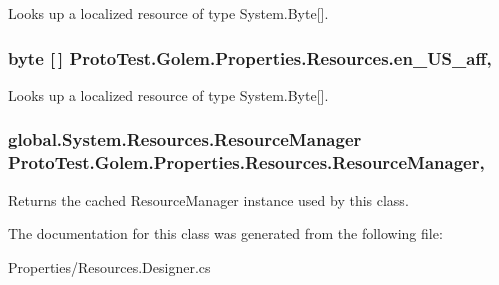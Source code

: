 Looks up a localized resource of type System.\-Byte\mbox{[}\mbox{]}. 

\hypertarget{class_proto_test_1_1_golem_1_1_properties_1_1_resources_abb898af626ae002fedc0fdc487741064}{
\subsubsection[{en\-\_\-\-U\-S\-\_\-aff}]{\setlength{\rightskip}{0pt plus 5cm}byte \mbox{[}$\,$\mbox{]} Proto\-Test.\-Golem.\-Properties.\-Resources.\-en\-\_\-\-U\-S\-\_\-aff\hspace{0.3cm}{\ttfamily [static]}, {\ttfamily [get]}}}\label{class_proto_test_1_1_golem_1_1_properties_1_1_resources_abb898af626ae002fedc0fdc487741064}


Looks up a localized resource of type System.\-Byte\mbox{[}\mbox{]}. 

\hypertarget{class_proto_test_1_1_golem_1_1_properties_1_1_resources_a9809cab615512da47ec45e295ad3b97a}{
\subsubsection[{Resource\-Manager}]{\setlength{\rightskip}{0pt plus 5cm}global.\-System.\-Resources.\-Resource\-Manager Proto\-Test.\-Golem.\-Properties.\-Resources.\-Resource\-Manager\hspace{0.3cm}{\ttfamily [static]}, {\ttfamily [get]}}}\label{class_proto_test_1_1_golem_1_1_properties_1_1_resources_a9809cab615512da47ec45e295ad3b97a}


Returns the cached Resource\-Manager instance used by this class. 



The documentation for this class was generated from the following file\-:\begin{DoxyCompactItemize}
\item 
Properties/Resources.\-Designer.\-cs\end{DoxyCompactItemize}
